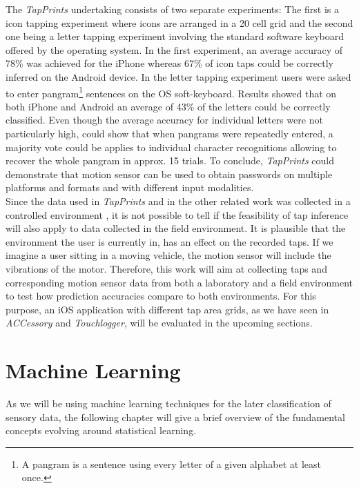The \textit{TapPrints} undertaking consists of two separate experiments: The first is a icon tapping experiment where icons are arranged in a 20 cell grid and the second one being a letter tapping experiment involving the standard software keyboard offered by the operating system. In the first experiment, an average accuracy of 78\% was achieved for the iPhone whereas 67\% of icon taps could be correctly inferred on the Android device.
In the letter tapping experiment users were asked to enter pangram\footnote{A pangram is a sentence using every letter of a given alphabet at least once.} sentences on the OS soft-keyboard. Results showed that on both iPhone and Android an average of 43\% of the letters could be correctly classified. Even though the average accuracy for individual letters were not particularly high, \citeauthor{Tapprints} could show that when pangrams were repeatedly entered, a majority vote could be applies to individual character recognitions allowing to recover the whole pangram in approx. 15 trials. To conclude, \textit{TapPrints} could demonstrate that motion sensor can be used to obtain passwords on multiple platforms and formats and with different input modalities.\\

Since the data used in \textit{TapPrints} and in the other related work was collected in a controlled environment \cite{Accessory,Touchlogger,Tapprints}, it is not possible to tell if the feasibility of tap inference will also apply to data collected in the field environment. It is plausible that the environment the user is currently in, has an effect on the recorded taps. If we imagine a user sitting in a moving vehicle, the motion sensor will include the vibrations of the motor. Therefore, this work will aim at collecting taps and corresponding motion sensor data from both a laboratory and a field environment to test how prediction accuracies compare to both environments. For this purpose, an iOS application with different tap area grids, as we have seen in \textit{ACCessory} and \textit{Touchlogger}, will be evaluated in the upcoming sections.

\newpage
\section{Machine Learning \label{sec:fieldstudy}}
As we will be using machine learning techniques for the later classification of sensory data, the following chapter will give a brief overview of the fundamental concepts evolving around statistical learning.

